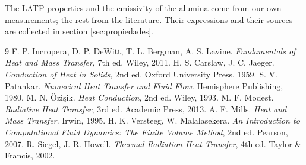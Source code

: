 \documentclass[11pt,a4paper]{article}
\begin{document}
The LATP properties and the emissivity of the alumina come from our own
measurements; the rest from the literature. Their expressions and their
sources are collected in section \ref{sec:propiedades}.

\begin{thebibliography}{9}
\small
{} F. P. Incropera, D. P. DeWitt, T. L. Bergman,
A. S. Lavine. \emph{Fundamentals of Heat and Mass Transfer}, 7th
ed. Wiley, 2011.
 H. S. Carslaw, J. C. Jaeger. \emph{Conduction of Heat in
Solids}, 2nd ed. Oxford University Press, 1959.
 S. V. Patankar. \emph{Numerical Heat Transfer and Fluid
Flow}. Hemisphere Publishing, 1980.
 M. N. Özişik. \emph{Heat Conduction}, 2nd
ed. Wiley, 1993.
 M. F. Modest. \emph{Radiative Heat Transfer},
3rd ed. Academic Press, 2013.
 A. F. Mills. \emph{Heat and Mass Transfer}. Irwin, 1995.
 H. K. Versteeg, W. Malalasekera. \emph{An Introduction to
Computational Fluid Dynamics: The Finite Volume Method},
2nd ed. Pearson, 2007.
 R. Siegel, J. R. Howell. \emph{Thermal Radiation Heat
Transfer}, 4th ed. Taylor \& Francis, 2002.
\end{thebibliography}
\end{document}
